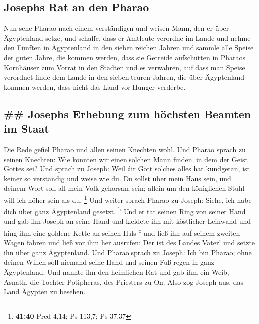 \hypertarget{josephs-rat-an-den-pharao}{%
\subsection{Josephs Rat an den Pharao}\label{josephs-rat-an-den-pharao}}

 Nun sehe Pharao nach einem verständigen und weisen Mann,
den er über Ägyptenland setze,  und schaffe, dass er
Amtleute verordne im Lande und nehme den Fünften in Ägyptenland in den
sieben reichen Jahren  und sammle alle Speise der guten
Jahre, die kommen werden, dass sie Getreide aufschütten in Pharaos
Kornhäuser zum Vorrat in den Städten und es verwahren, 
auf dass man Speise verordnet finde dem Lande in den sieben teuren
Jahren, die über Ägyptenland kommen werden, dass nicht das Land vor
Hunger verderbe.

\hypertarget{josephs-erhebung-zum-huxf6chsten-beamten-im-staat}{%
\subsection{\#\# Josephs Erhebung zum höchsten Beamten im
Staat}\label{josephs-erhebung-zum-huxf6chsten-beamten-im-staat}}

 Die Rede gefiel Pharao und allen seinen Knechten wohl.
 Und Pharao sprach zu seinen Knechten: Wie könnten wir
einen solchen Mann finden, in dem der Geist Gottes sei? 
Und sprach zu Joseph: Weil dir Gott solches alles hat kundgetan, ist
keiner so verständig und weise wie du.  Du sollst über
mein Haus sein, und deinem Wort soll all mein Volk gehorsam sein; allein
um den königlichen Stuhl will ich höher sein als du. \footnote{\textbf{41:40}
  Pred 4,14; Ps 113,7; Ps 37,37}  Und weiter sprach
Pharao zu Joseph: Siehe, ich habe dich über ganz Ägyptenland gesetzt.
\textsuperscript{b}  Und er tat seinen Ring von seiner
Hand und gab ihn Joseph an seine Hand und kleidete ihn mit köstlicher
Leinwand und hing ihm eine goldene Kette an seinen Hals
\textsuperscript{c}  und ließ ihn auf seinem zweiten
Wagen fahren und ließ vor ihm her ausrufen: Der ist des Landes Vater!
und setzte ihn über ganz Ägyptenland.  Und Pharao sprach
zu Joseph: Ich bin Pharao; ohne deinen Willen soll niemand seine Hand
und seinen Fuß regen in ganz Ägyptenland.  Und nannte ihn
den heimlichen Rat und gab ihm ein Weib, Asnath, die Tochter Potipheras,
des Priesters zu On. Also zog Joseph aus, das Land Ägypten zu besehen.

